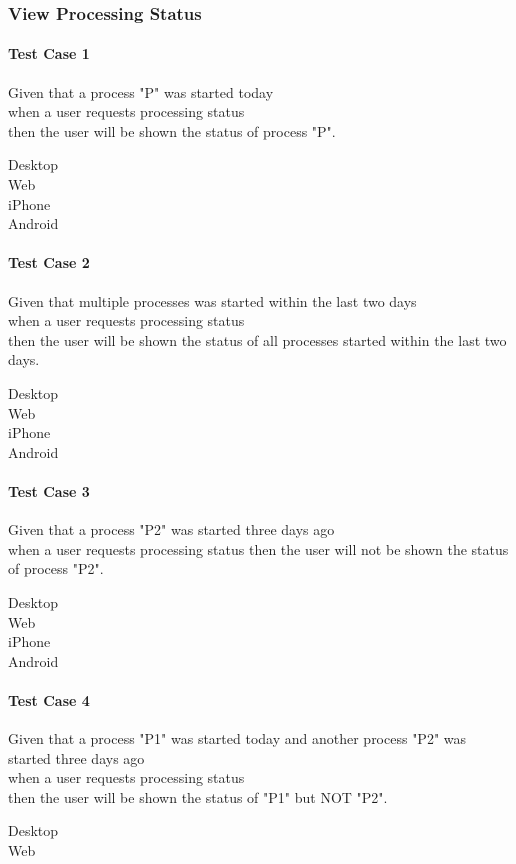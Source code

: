 \subsubsection{View Processing Status}
\paragraph*{Test Case 1}
Given that a process "P" was started today \\ when a user requests processing status \\ then the user will be shown the status of process "P".
\begin{description}
 \item[Desktop]
 \item[Web]
 \item[iPhone] \cmark
 \item[Android]
\end{description}
\paragraph*{Test Case 2}
Given that multiple processes was started within the last two days \\ when a user requests processing status \\ then the user will be shown the status of all processes started within the last two days.
\begin{description}
 \item[Desktop]
 \item[Web]
 \item[iPhone] \cmark
 \item[Android]
\end{description}
\paragraph*{Test Case 3}
Given that a process "P2" was started three days ago \\ when a user requests processing status
then the user will not be shown the status of process "P2".
\begin{description}
 \item[Desktop]
 \item[Web]
 \item[iPhone]
 \item[Android]
\end{description}
\paragraph*{Test Case 4}
Given that a process "P1" was started today and another process "P2" was started three days ago \\ when a user requests processing status \\ then the user will be shown the status of "P1" but NOT "P2".
\begin{description}
 \item[Desktop]
 \item[Web]
\end{description}

